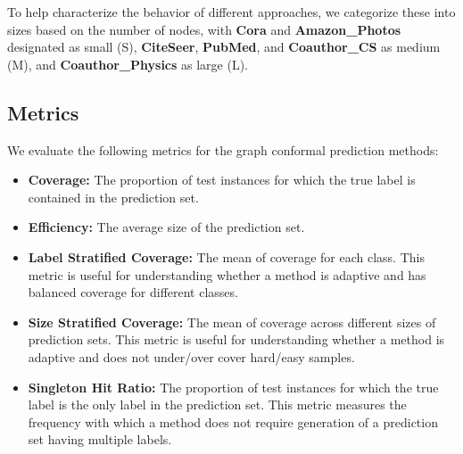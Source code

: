 To help characterize the behavior of different approaches, we categorize these into sizes based on the number of nodes, with \textbf{Cora} and \textbf{Amazon\_Photos} designated as small (S), \textbf{CiteSeer}, \textbf{PubMed}, and \textbf{Coauthor\_CS} as medium (M), and \textbf{Coauthor\_Physics} as large (L).

\subsection{Metrics}
We evaluate the following metrics for the graph conformal prediction methods:
\begin{itemize}
    \item \textbf{Coverage:} The proportion of test instances for which the true label is contained in the prediction set.
    \item \textbf{Efficiency:} The average size of the prediction set.
    \item \textbf{Label Stratified Coverage:} The mean of coverage for each class. This metric is useful for understanding whether a method is adaptive and has balanced coverage for different classes.
    \item \textbf{Size Stratified Coverage:} The mean of coverage across different sizes of prediction sets. This metric is useful for understanding whether a method is adaptive and does not under/over cover hard/easy samples.
    \item \textbf{Singleton Hit Ratio:} The proportion of test instances for which the true label is the only label in the prediction set. This metric measures the frequency with which a method does not require generation of a prediction set having multiple labels.
\end{itemize}

